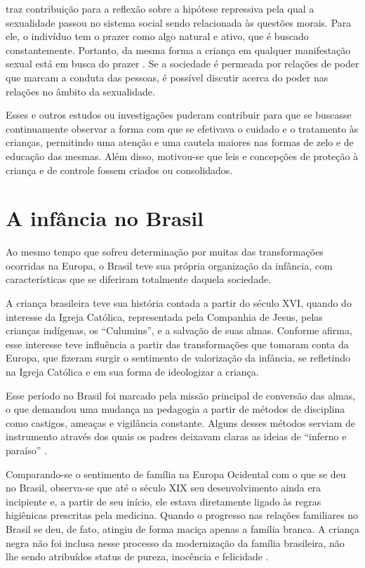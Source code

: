  traz contribuição para a reflexão sobre a hipótese repressiva pela qual a sexualidade passou no sistema social sendo relacionada às questões morais. Para ele, o indivíduo tem o prazer como algo natural e ativo, que é buscado constantemente. Portanto, da mesma forma a criança em qualquer manifestação sexual está em busca do prazer \cite{DONIZETE2010}. Se a sociedade é permeada por relações de poder que marcam a conduta das pessoas, é possível discutir acerca do poder nas relações no âmbito da sexualidade.

Esses e outros estudos ou investigações puderam contribuir para que se buscasse continuamente observar a forma com que se efetivava o cuidado e o tratamento às crianças, permitindo uma atenção e uma cautela maiores nas formas de zelo e de educação das mesmas. Além disso, motivou-se que leis e concepções de proteção à criança e de controle fossem criados ou consolidados.

\section{A infância no Brasil}

Ao mesmo tempo que sofreu determinação por muitas das transformações ocorridas na Europa, o Brasil teve sua própria organização da infância, com características que se diferiram totalmente daquela sociedade.

A criança brasileira teve sua história contada a partir do século XVI, quando do interesse da Igreja Católica, representada pela Companhia de Jesus, pelas crianças indígenas, os ``Culumins'', e a salvação de suas almas. Conforme  afirma, esse interesse teve influência a partir das transformações que tomaram conta da Europa, que fizeram surgir o sentimento de valorização da infância, se refletindo na Igreja Católica e em sua forma de ideologizar a criança.

Esse período no Brasil foi marcado pela missão principal de conversão das almas, o que demandou uma mudança na pedagogia a partir de métodos de disciplina como castigos, ameaças e vigilância constante. Alguns desses métodos serviam de instrumento através dos quais os padres deixavam claras as ideias de ``inferno e paraíso'' \cite[p. 37]{SANTOS1994}.

Comparando-se o sentimento de família na Europa Ocidental com o que se deu no Brasil, observa-se que até o século XIX seu desenvolvimento ainda era incipiente e, a partir de seu início, ele estava diretamente ligado às regras higiênicas prescritas pela medicina. Quando o progresso nas relações familiares no Brasil se deu, de fato, atingiu de forma maciça apenas a família branca. A criança negra não foi inclusa nesse processo da modernização da família brasileira, não lhe sendo atribuídos status de pureza, inocência e felicidade \cite{SANTOS1994}. 

